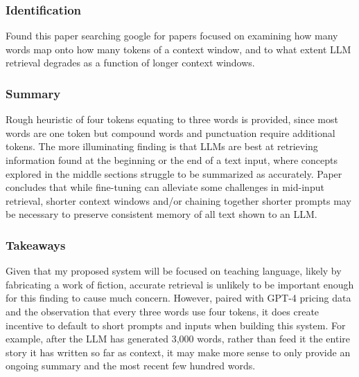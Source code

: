 \documentclass[
	letterpaper, %
]{jdf}
\begin{document}
\subsubsection{Identification}
Found this paper searching google for papers focused on examining how many words map onto how many tokens of a context window, and to what extent LLM retrieval degrades as a function of longer context windows.

\subsubsection{Summary}
Rough heuristic of four tokens equating to three words is provided, since most words are one token but compound words and punctuation require additional tokens. The more illuminating finding is that LLMs are best at retrieving information found at the beginning or the end of a text input, where concepts explored in the middle sections struggle to be summarized as accurately. Paper concludes that while fine-tuning can alleviate some challenges in mid-input retrieval, shorter context windows and/or chaining together shorter prompts may be necessary to preserve consistent memory of all text shown to an LLM.

\subsubsection{Takeaways}
Given that my proposed system will be focused on teaching language, likely by fabricating a work of fiction, accurate retrieval is unlikely to be important enough for this finding to cause much concern. However, paired with GPT-4 pricing data and the observation that every three words use four tokens, it does create incentive to default to short prompts and inputs when building this system. For example, after the LLM has generated 3,000 words, rather than feed it the entire story it has written so far as context, it may make more sense to only provide an ongoing summary and the most recent few hundred words.

\subsection{}
\end{document}
